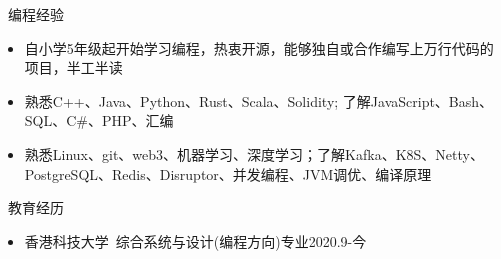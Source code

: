 \documentclass[UTF8]{resume}
\begin{document}
  
\begin{rSection}{\faCogs~编程经验}
    \begin{itemize}
        \itemsep -0.5em
        \item 自小学5年级起开始学习编程，热衷开源，能够独自或合作编写上万行代码的项目，半工半读
        \item 熟悉C++、Java、Python、Rust、Scala、Solidity; 了解JavaScript、Bash、SQL、C\#、PHP、汇编
        \item 熟悉Linux、git、web3、机器学习、深度学习；了解Kafka、K8S、Netty、PostgreSQL、Redis、Disruptor、并发编程、JVM调优、编译原理
    \end{itemize}
    
\end{rSection}
\begin{rSection}{\faGraduationCap~教育经历}
    \begin{itemize}
        \item 香港科技大学~综合系统与设计(编程方向)专业\hfill 2020.9-今
    \end{itemize}
\end{rSection}
\end{document}
